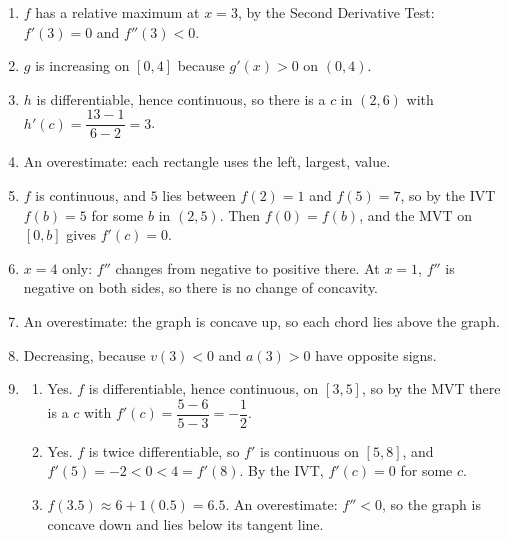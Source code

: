 \documentclass[11pt]{article}
\begin{document}
\newpage
\begin{solbox}
\begin{enumerate}[leftmargin=*,itemsep=4pt]
  \item $f$ has a relative maximum at $x=3$, by the Second Derivative Test: $f'(3)=0$ and $f''(3)<0$.
  \item $g$ is increasing on $[0,4]$ because $g'(x)>0$ on $(0,4)$.
  \item $h$ is differentiable, hence continuous, so there is a $c$ in $(2,6)$ with $h'(c)=\dfrac{13-1}{6-2}=3$.
  \item An overestimate: each rectangle uses the left, largest, value.
  \item $f$ is continuous, and $5$ lies between $f(2)=1$ and $f(5)=7$, so by the IVT $f(b)=5$ for some $b$ in $(2,5)$. Then $f(0)=f(b)$, and the MVT on $[0,b]$ gives $f'(c)=0$.
  \item $x=4$ only: $f''$ changes from negative to positive there. At $x=1$, $f''$ is negative on both sides, so there is no change of concavity.
  \item An overestimate: the graph is concave up, so each chord lies above the graph.
  \item Decreasing, because $v(3)<0$ and $a(3)>0$ have opposite signs.
  \item \begin{enumerate}[label=(\alph*),leftmargin=*,itemsep=3pt]
    \item Yes. $f$ is differentiable, hence continuous, on $[3,5]$, so by the MVT there is a $c$ with $f'(c)=\dfrac{5-6}{5-3}=-\dfrac12$.
    \item Yes. $f$ is twice differentiable, so $f'$ is continuous on $[5,8]$, and $f'(5)=-2<0<4=f'(8)$. By the IVT, $f'(c)=0$ for some $c$.
    \item $f(3.5)\approx6+1(0.5)=6.5$. An overestimate: $f''<0$, so the graph is concave down and lies below its tangent line.
  \end{enumerate}
\end{enumerate}
\end{solbox}
\end{document}
